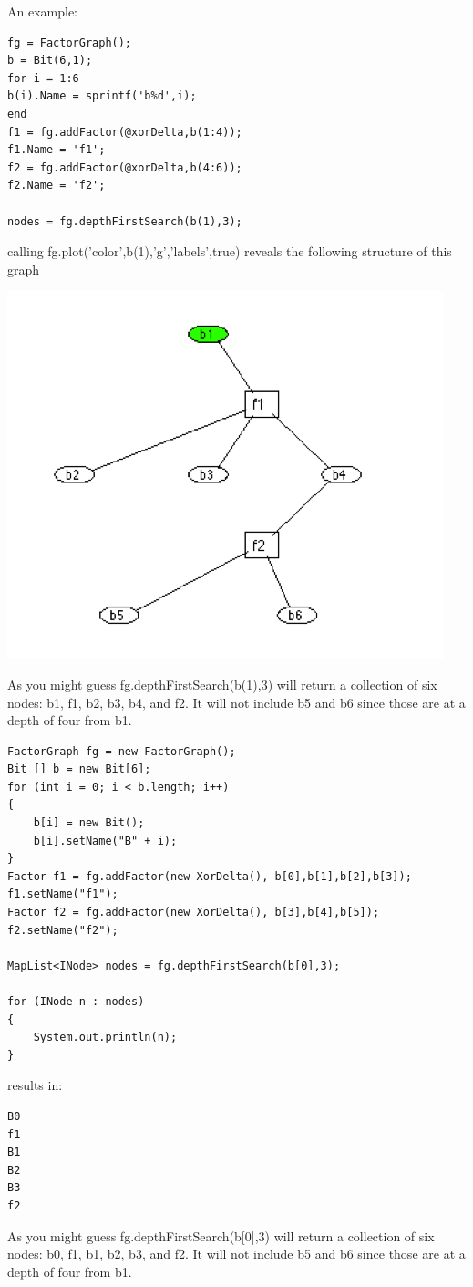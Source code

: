 An example:

\ifmatlab
\begin{lstlisting}
fg = FactorGraph();
b = Bit(6,1);
for i = 1:6
b(i).Name = sprintf('b%d',i);
end
f1 = fg.addFactor(@xorDelta,b(1:4));
f1.Name = 'f1';
f2 = fg.addFactor(@xorDelta,b(4:6));
f2.Name = 'f2';
 
nodes = fg.depthFirstSearch(b(1),3);
\end{lstlisting}

calling fg.plot('color',b(1),'g','labels',true) reveals the following structure of this graph

\includegraphics{images/Introspection.png}
 
As you might guess fg.depthFirstSearch(b(1),3) will return a collection of six nodes: b1, f1, b2, b3, b4, and f2.  It will not include b5 and b6 since those are at a depth of four from b1.
\fi

\ifjava
\begin{lstlisting}
FactorGraph fg = new FactorGraph();
Bit [] b = new Bit[6];
for (int i = 0; i < b.length; i++)
{
	b[i] = new Bit();
	b[i].setName("B" + i);
}
Factor f1 = fg.addFactor(new XorDelta(), b[0],b[1],b[2],b[3]);
f1.setName("f1");
Factor f2 = fg.addFactor(new XorDelta(), b[3],b[4],b[5]);
f2.setName("f2");
 
MapList<INode> nodes = fg.depthFirstSearch(b[0],3);

for (INode n : nodes)
{
	System.out.println(n);
}
\end{lstlisting}

results in:

\begin{lstlisting}
B0
f1
B1
B2
B3
f2
\end{lstlisting}
 
As you might guess fg.depthFirstSearch(b[0],3) will return a collection of six nodes: b0, f1, b1, b2, b3, and f2.  It will not include b5 and b6 since those are at a depth of four from b1.

\fi





